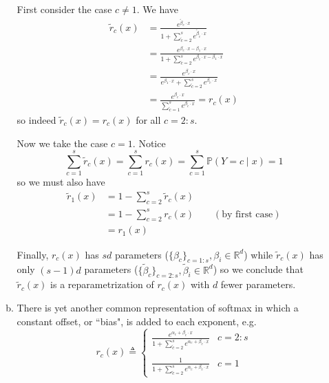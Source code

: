 \documentclass[11pt]{report}
\newcommand{\R}{\mathbb{R}}
\renewcommand{\P}{\mathbb{P}}
\begin{document}
\begin{enumerate}[1.]
\begin{enumerate}[(a)]
		            \color{blue}
		            First consider the case $c \neq 1$. We have
		            \begin{align*}
			            \tilde r_c(x) & = \frac{e^{\tilde \beta_c \cdot x}}{1 + \sum_{\tilde c = 2}^s e^{\tilde \beta_{\tilde c} \cdot x}}                       \\
			                          & = \frac{e^{\beta_c \cdot x - \beta_1 \cdot x}}{1 + \sum_{\tilde c = 2}^s e^{\beta_{\tilde c} \cdot x - \beta_1 \cdot x}} \\
			                          & = \frac{e^{\beta_c \cdot x}}{e^{\beta_1 \cdot x} + \sum_{\tilde c = 2}^s e^{\beta_{\tilde c} \cdot x}}                   \\
			                          & = \frac{e^{\beta_c \cdot x}}{\sum_{\tilde c = 1}^s e^{\beta_{\tilde c} \cdot x}} = r_c(x)
		            \end{align*}
		            so indeed $\tilde r_c(x) = r_c(x)$ for all $c=2:s$.

		            Now we take the case $c = 1$. Notice
		            \[\sum_{c=1}^s \tilde r_c(x) = \sum_{c=1}^s r_c(x) = \sum_{c=1}^{s} \P(Y = c \; | \; x) = 1\]
		            so we must also have
		            \begin{align*}
			            \tilde r_1(x) & = 1 - \sum_{c=2}^s \tilde r_c(x)                        \\
			                          & = 1 - \sum_{c=2}^s r_c(x) \qquad (\text{by first case}) \\
			                          & = r_1(x)
		            \end{align*}

		            Finally, $r_c(x)$ has $sd$ parameters ($\{\beta_c\}_{c = 1:s}, \beta_i \in \R^d$) while $\tilde r_c(x)$ has only $(s-1)d$ parameters ($\{\tilde \beta_c\}_{c = 2:s}, \tilde \beta_i \in \R^d$) so we conclude that $\tilde r_c(x)$ is a reparametrization of $r_c(x)$ with $d$ fewer parameters.

		            \color{black}


		      \item There is yet another common representation of softmax in which a constant offset, or ``bias", is added to each
		            exponent, e.g.
		            \[
			            {r}_c(x) \triangleq \begin{cases}  \frac{e^{\alpha_c+\beta_{c}\cdot x}}{1+\sum_{\tilde{c}=2}^s e^{\alpha_c+\beta_{\tilde{c}}\cdot x}} &
               c=2:s                                                                                                \\ \\
               \frac{1}{1+\sum_{\tilde{c}=2}^s e^{\alpha_{\tilde{c}} + \beta_{\tilde{c}}\cdot x} }                &
               c=1
			            \end{cases}
		            \]


\end{enumerate}
\end{enumerate}
\end{document}
